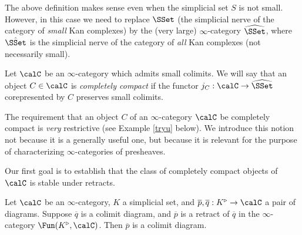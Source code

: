 \begin{remark}
The above definition makes sense even when the simplicial set $S$ is not small. However, in
this case we need to replace $\SSet$ (the simplicial nerve of the category of {\em small} Kan complexes) by the (very large) $\infty$-category $\widehat{\SSet}$, where $\hat{\SSet}$ is the simplicial nerve of the category of {\em all} Kan complexes (not necessarily small).
\end{remark}

\begin{definition}\label{complcompdef}
Let $\calC$ be an $\infty$-category which admits small colimits. We will say that an object
$C \in \calC$ is {\it completely compact} if the functor $j_{C}: \calC \rightarrow \widehat{\SSet}$
corepresented by $C$ preserves small colimits.
\end{definition}

The requirement that an object $C$ of an $\infty$-category $\calC$ be completely compact
is {\em very} restrictive (see Example \ref{tryu} below). We introduce this notion not because it is a generally useful one, but because it is relevant for the purpose of characterizing $\infty$-categories of presheaves.

Our first goal is to establish that the class of completely compact objects of $\calC$ is stable under retracts.

\begin{lemma}\label{compcompcomp}
Let $\calC$ be an $\infty$-category, $K$ a simplicial set, and $\overline{p}, \overline{q}: K^{\triangleright} \rightarrow \calC$ a pair of diagrams. Suppose $\overline{q}$ is a colimit diagram, and $\overline{p}$ is a retract of $\overline{q}$ in the $\infty$-category $\Fun(K^{\triangleright}, \calC)$. Then $\overline{p}$ is a colimit diagram.
\end{lemma}

